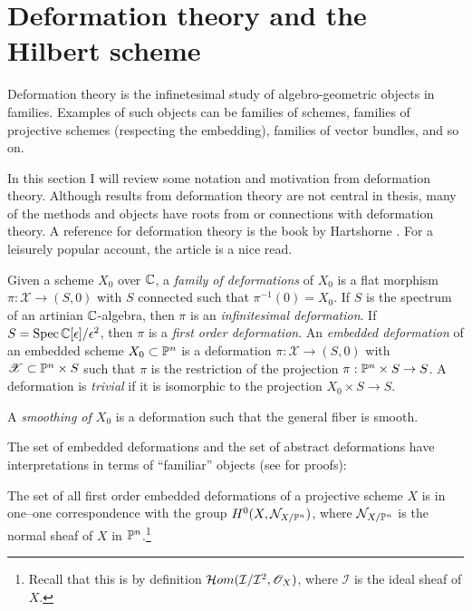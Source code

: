

\section{Deformation theory and the Hilbert scheme}

Deformation theory is the infinetesimal study of algebro-geometric objects in families. Examples of such objects can be families of schemes, families of projective schemes (respecting the embedding), families of vector bundles, and so on.

In this section I will review some notation and motivation from deformation theory. Although results from deformation theory are not central in thesis, many of the methods and objects have roots from or connections with deformation theory. 
A reference for deformation theory is the book by Hartshorne \cite{hartshorne_deformations}. For a leisurely popular account, the article \cite{mazur_deformations} is a nice read.

Given a scheme $X_0$ over $\C$, a \emph{family of deformations} of $X_0$ is a flat morphism $\pi:\mathscr X \to (S,0)$ with $S$ connected such that $\pi^{-1}(0)=X_0$. If $S$ is the spectrum of an artinian $\C$-algebra, then $\pi$ is an \emph{infinitesimal deformation}. If $S=\Spec \C[\epsilon]/\epsilon^2$, then  $\pi$ is a \emph{first order deformation}. An \emph{embedded deformation} of an embedded scheme $X_0 \subset \P^n$ is a deformation $\pi:\mathscr X \to (S,0)$ with $\mathscr X \subset \P^n \times S$ such that $\pi$ is the restriction of the projection $\pi:\P^n \times S \to S$. A deformation is \emph{trivial} if it is isomorphic to the projection $X_0 \times S \to S$.

A \emph{smoothing of $X_0$} is a deformation such that the general fiber is smooth.

The set of embedded deformations and the set of abstract deformations have interpretations in terms of ``familiar'' objects (see \cite{hartshorne_deformations} for proofs):

\begin{proposition}
The set of all first order embedded deformations of a projective scheme $X$ is in one--one correspondence with the group $H^0(X,\mathcal N_{X/\P^n})$, where $\mathcal N_{X/\P^n}$ is the normal sheaf of $X$ in $\P^n$.\footnote{Recall that this is by definition $\mathcal Hom(\mathcal I/\mathcal I^2, \OO_X)$, where $\mathcal I$ is the ideal sheaf of $X$.}
\end{proposition}

